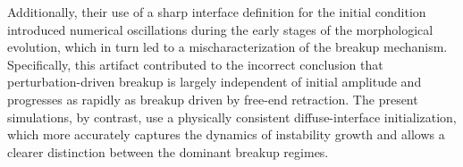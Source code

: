 Additionally, their use of a sharp interface definition for the initial condition introduced numerical oscillations during the early stages of the morphological evolution, which in turn led to a mischaracterization of the breakup mechanism. Specifically, this artifact contributed to the incorrect conclusion that perturbation-driven breakup is largely independent of initial amplitude and progresses as rapidly as breakup driven by free-end retraction. The present simulations, by contrast, use a physically consistent diffuse-interface initialization, which more accurately captures the dynamics of instability growth and allows a clearer distinction between the dominant breakup regimes.